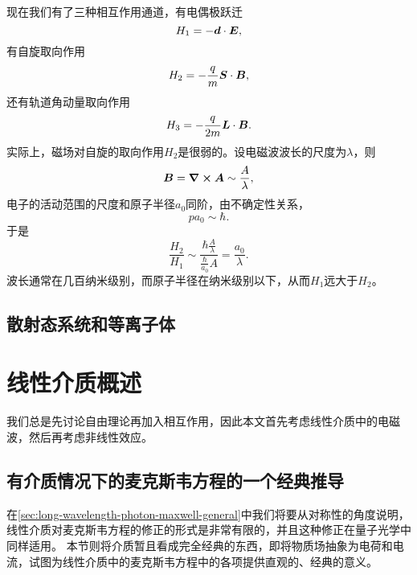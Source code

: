 现在我们有了三种相互作用通道，有电偶极跃迁
\begin{equation}
    H_1 = - \vb*{d} \cdot \vb*{E},
\end{equation}
有自旋取向作用
\begin{equation}
    H_2 = - \frac{q}{m} \vb*{S} \cdot \vb*{B},
\end{equation}
还有轨道角动量取向作用
\begin{equation}
    H_3 = - \frac{q}{2m} \vb*{L} \cdot \vb*{B}.
\end{equation}
实际上，磁场对自旋的取向作用${H}_2$是很弱的。设电磁波波长的尺度为$\lambda$，则
\[
    \vb*{B} = \curl{\vb*{A}} \sim \frac{A}{\lambda},
\]
电子的活动范围的尺度和原子半径$a_0$同阶，由不确定性关系，
\[
    p a_0 \sim \hbar.
\]
于是
\[
    \frac{H_2}{H_1} \sim \frac{\hbar \frac{A}{\lambda}}{\frac{\hbar}{a_0} A} = \frac{a_0}{\lambda}.
\]
波长通常在几百纳米级别，而原子半径在纳米级别以下，从而${H}_1$远大于${H}_2$。

\section{散射态系统和等离子体}



\chapter{线性介质概述}

我们总是先讨论自由理论再加入相互作用，因此本文首先考虑线性介质中的电磁波，然后再考虑非线性效应。

\section{有介质情况下的麦克斯韦方程的一个经典推导}

在\autoref{sec:long-wavelength-photon-maxwell-general}中我们将要从对称性的角度说明，线性介质对麦克斯韦方程的修正的形式是非常有限的，并且这种修正在量子光学中同样适用。
本节则将介质暂且看成完全经典的东西，即将物质场抽象为电荷和电流，试图为线性介质中的麦克斯韦方程中的各项提供直观的、经典的意义。

